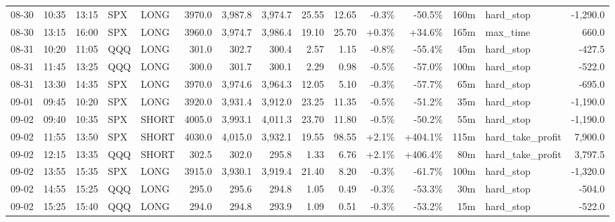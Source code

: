\documentclass[11pt,a4paper,twoside]{article}
\begin{document}
\begin{landscape}
\begin{center}
\begin{longtable}{>{\color{txtmain}}l l l l l r r r r r r r r >{\color{txtmain}}l r}
08-30 & 10:35 & 13:15 & SPX & LONG & 3970.0 & 3,987.8 & 3,974.7 & 25.55 & 12.65 & \textcolor{lossred}{-0.3\%} & \textcolor{lossred}{-50.5\%} & 160m & hard\_stop & \textcolor{lossred}{-1,290.0} \\
08-30 & 13:15 & 16:00 & SPX & LONG & 3960.0 & 3,974.7 & 3,986.4 & 19.10 & 25.70 & \textcolor{wingreen}{+0.3\%} & \textcolor{wingreen}{+34.6\%} & 165m & max\_time & \textcolor{wingreen}{660.0} \\
08-31 & 10:20 & 11:05 & QQQ & LONG & 301.0 & 302.7 & 300.4 & 2.57 & 1.15 & \textcolor{lossred}{-0.8\%} & \textcolor{lossred}{-55.4\%} & 45m & hard\_stop & \textcolor{lossred}{-427.5} \\
08-31 & 11:45 & 13:25 & QQQ & LONG & 300.0 & 301.7 & 300.1 & 2.29 & 0.98 & \textcolor{lossred}{-0.5\%} & \textcolor{lossred}{-57.0\%} & 100m & hard\_stop & \textcolor{lossred}{-522.0} \\
08-31 & 13:30 & 14:35 & SPX & LONG & 3970.0 & 3,974.6 & 3,964.3 & 12.05 & 5.10 & \textcolor{lossred}{-0.3\%} & \textcolor{lossred}{-57.7\%} & 65m & hard\_stop & \textcolor{lossred}{-695.0} \\
09-01 & 09:45 & 10:20 & SPX & LONG & 3920.0 & 3,931.4 & 3,912.0 & 23.25 & 11.35 & \textcolor{lossred}{-0.5\%} & \textcolor{lossred}{-51.2\%} & 35m & hard\_stop & \textcolor{lossred}{-1,190.0} \\
09-02 & 09:40 & 10:35 & SPX & SHORT & 4005.0 & 3,993.1 & 4,011.3 & 23.70 & 11.80 & \textcolor{lossred}{-0.5\%} & \textcolor{lossred}{-50.2\%} & 55m & hard\_stop & \textcolor{lossred}{-1,190.0} \\
09-02 & 11:55 & 13:50 & SPX & SHORT & 4030.0 & 4,015.0 & 3,932.1 & 19.55 & 98.55 & \textcolor{wingreen}{+2.1\%} & \textcolor{wingreen}{+404.1\%} & 115m & hard\_take\_profit & \textcolor{wingreen}{7,900.0} \\
09-02 & 12:15 & 13:35 & QQQ & SHORT & 302.5 & 302.0 & 295.8 & 1.33 & 6.76 & \textcolor{wingreen}{+2.1\%} & \textcolor{wingreen}{+406.4\%} & 80m & hard\_take\_profit & \textcolor{wingreen}{3,797.5} \\
09-02 & 13:55 & 15:35 & SPX & LONG & 3915.0 & 3,930.1 & 3,919.4 & 21.40 & 8.20 & \textcolor{lossred}{-0.3\%} & \textcolor{lossred}{-61.7\%} & 100m & hard\_stop & \textcolor{lossred}{-1,320.0} \\
09-02 & 14:55 & 15:25 & QQQ & LONG & 295.0 & 295.6 & 294.8 & 1.05 & 0.49 & \textcolor{lossred}{-0.3\%} & \textcolor{lossred}{-53.3\%} & 30m & hard\_stop & \textcolor{lossred}{-504.0} \\
09-02 & 15:25 & 15:40 & QQQ & LONG & 294.0 & 294.8 & 293.9 & 1.09 & 0.51 & \textcolor{lossred}{-0.3\%} & \textcolor{lossred}{-53.2\%} & 15m & hard\_stop & \textcolor{lossred}{-522.0} \\

\end{longtable}
\end{center}
\end{landscape}
\end{document}
